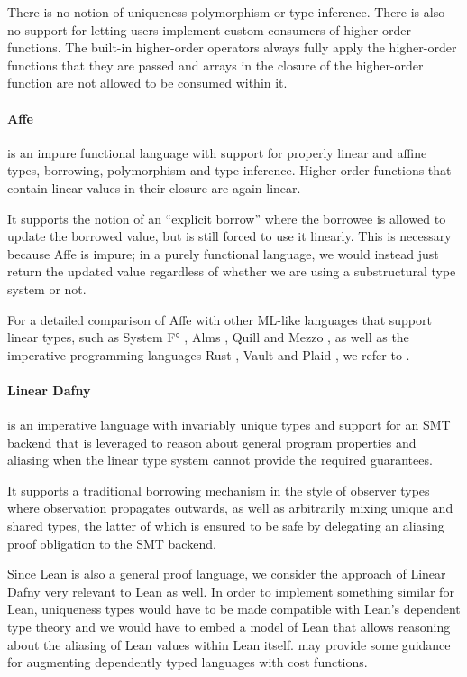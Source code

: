 There is no notion of uniqueness polymorphism or type inference. There is also no support for letting users implement custom consumers of higher-order functions. The built-in higher-order operators always fully apply the higher-order functions that they are passed and arrays in the closure of the higher-order function are not allowed to be consumed within it.

\paragraph{Affe \citep{radanne_kindly_2020}} is an impure functional language with support for properly linear and affine types, borrowing, polymorphism and type inference. Higher-order functions that contain linear values in their closure are again linear.

It supports the notion of an ``explicit borrow'' where the borrowee is allowed to update the borrowed value, but is still forced to use it linearly. This is necessary because Affe is impure; in a purely functional language, we would instead just return the updated value regardless of whether we are using a substructural type system or not.

For a detailed comparison of Affe with other ML-like languages that support linear types, such as System F° \citep{mazurak_lightweight_2010}, Alms \citep{tov_practical_2011}, Quill \citep{morris_best_2016} and Mezzo \citep{balabonski_design_2016}, as well as the imperative programming languages Rust \citep{weiss_oxide_2021}, Vault \citep{deline_enforcing_2001} and Plaid \citep{garcia_foundations_2014}, we refer to \cite{radanne_kindly_2020}.

\paragraph{Linear Dafny \citep{li_linear_2022}} is an imperative language with invariably unique types and support for an SMT backend \citep{barrett_satisfiability_2018} that is leveraged to reason about general program properties and aliasing when the linear type system cannot provide the required guarantees. 

It supports a traditional borrowing mechanism in the style of observer types \citep{odersky_observers_1992} where observation propagates outwards, as well as arbitrarily mixing unique and shared types, the latter of which is ensured to be safe by delegating an aliasing proof obligation to the SMT backend.

Since Lean is also a general proof language, we consider the approach of Linear Dafny very relevant to Lean as well. In order to implement something similar for Lean, uniqueness types would have to be made compatible with Lean's dependent type theory and we would have to embed a model of Lean that allows reasoning about the aliasing of Lean values within Lean itself. \cite{niu_cost-aware_2022} may provide some guidance for augmenting dependently typed languages with cost functions.